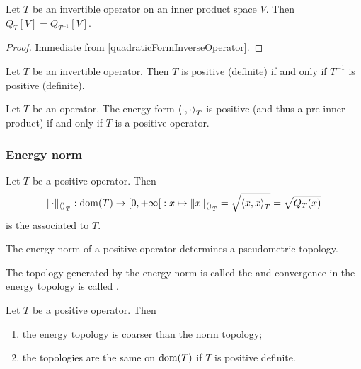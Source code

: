 \begin{lemma}
Let $T$ be an invertible operator on an inner product space $V$. Then $Q_T[V] = Q_{T^{-1}}[V]$.
\end{lemma}
\begin{proof}
Immediate from \ref{quadraticFormInverseOperator}.
\end{proof}
\begin{corollary}
Let $T$ be an invertible operator. Then $T$ is positive (definite) \textup{if and only if} $T^{-1}$ is positive (definite).
\end{corollary}

\begin{lemma} \label{positiveOperatorPositiveEnergyForm}
Let $T$ be an operator. The energy form $\inner{\cdot,\cdot}_T$ is positive (and thus a pre-inner product) \textup{if and only if} $T$ is a positive operator.
\end{lemma}

\subsubsection{Energy norm}
\begin{definition}
Let $T$ be a positive operator. Then
\[ \norm{\cdot}_{\inner{}_T}: \dom(T) \to \interval[co]{0,+\infty}: x\mapsto \norm{x}_{\inner{}_T} = \sqrt{\inner{x,x}_T} = \sqrt{Q_T(x)} \]
is the  associated to $T$.
\end{definition}

\begin{lemma}
The energy norm of a positive operator determines a pseudometric topology.
\end{lemma}

\begin{definition}
The topology generated by the energy norm is called the  and convergence in the energy topology is called .
\end{definition}

\begin{proposition}
Let $T$ be a positive operator. Then
\begin{enumerate}
\item the energy topology is coarser than the norm topology;
\item the topologies are the same on $\operatorname{dom}(T)$ if $T$ is positive definite.
\end{enumerate}
\end{proposition}

